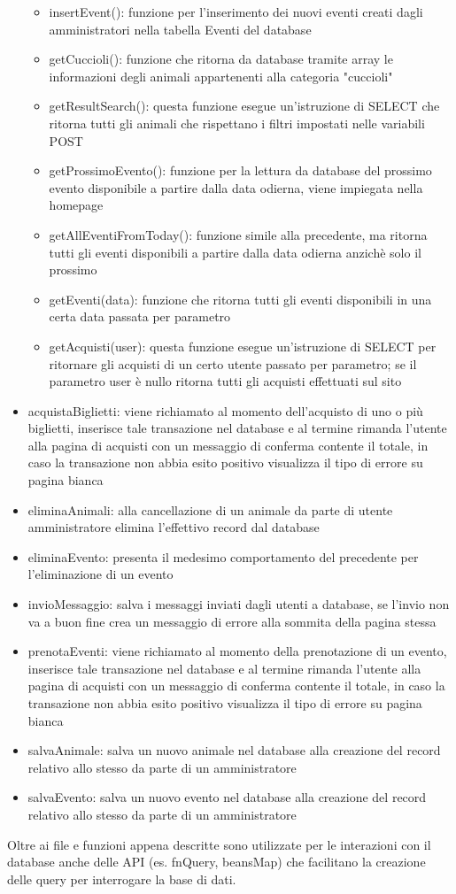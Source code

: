 \begin{itemize}
\begin{itemize}
\item insertEvent(): funzione per l'inserimento dei nuovi eventi creati dagli amministratori nella tabella Eventi del database
\item getCuccioli(): funzione che ritorna da database tramite array le informazioni degli animali appartenenti alla categoria "cuccioli"
\item getResultSearch(): questa funzione esegue un'istruzione di SELECT che ritorna tutti gli animali che rispettano i filtri impostati nelle variabili POST
\item getProssimoEvento(): funzione per la lettura da database del prossimo evento disponibile a partire dalla data odierna, viene impiegata nella homepage
\item getAllEventiFromToday(): funzione simile alla precedente, ma ritorna tutti gli eventi disponibili a partire dalla data odierna anzichè solo il prossimo
\item getEventi(data): funzione che ritorna tutti gli eventi disponibili in una certa data passata per parametro
\item getAcquisti(user): questa funzione esegue un'istruzione di SELECT per ritornare gli acquisti di un certo utente passato per parametro; se il parametro user è nullo ritorna tutti gli acquisti effettuati sul sito
\end{itemize}
\item acquistaBiglietti: viene richiamato al momento dell'acquisto di uno o più biglietti, inserisce tale transazione nel database e al termine rimanda l'utente alla pagina di acquisti con un messaggio di conferma contente il totale, in caso la transazione non abbia esito positivo visualizza il tipo di errore su pagina bianca
\item eliminaAnimali: alla cancellazione di un animale da parte di utente amministratore elimina l'effettivo record dal database
\item eliminaEvento: presenta il medesimo comportamento del precedente per l'eliminazione di un evento
\item invioMessaggio: salva i messaggi inviati dagli utenti a database, se l'invio non va a buon fine crea un messaggio di errore alla sommita della pagina stessa
\item prenotaEventi: viene richiamato al momento della prenotazione di un evento, inserisce tale transazione nel database e al termine rimanda l'utente alla pagina di acquisti con un messaggio di conferma contente il totale, in caso la transazione non abbia esito positivo visualizza il tipo di errore su pagina bianca
\item salvaAnimale: salva un nuovo animale nel database alla creazione del record relativo allo stesso da parte di un amministratore
\item salvaEvento: salva un nuovo evento nel database alla creazione del record relativo allo stesso da parte di un amministratore
\end{itemize}
Oltre ai file e funzioni appena descritte sono utilizzate per le interazioni con il database anche delle API (es. fnQuery, beansMap) che facilitano la creazione delle query per interrogare la base di dati.
